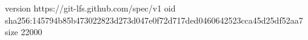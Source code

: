 version https://git-lfs.github.com/spec/v1
oid sha256:145794b85b473022823d273d047e0f72d717ded0460642523cca45d25df52aa7
size 22000
